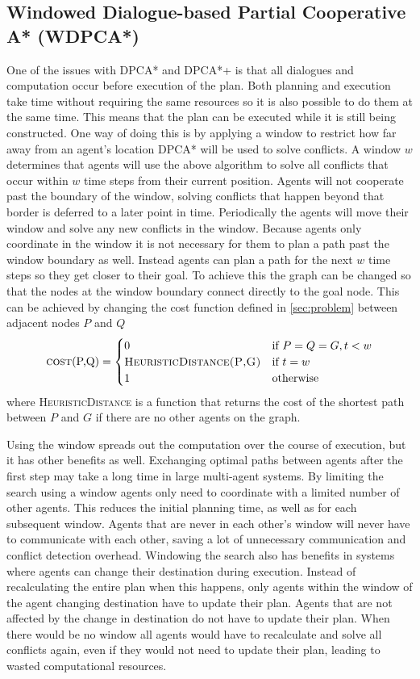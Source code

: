 \subsection{Windowed Dialogue-based Partial Cooperative A* (WDPCA*)}
One of the issues with DPCA* and DPCA*+ is that all dialogues and computation
occur before execution of the plan. Both planning and execution take time
without requiring the same resources so it is also possible to do them at the
same time. This means that the plan can be executed while it is still being
constructed. One way of doing this is by applying a window to restrict how far
away from an agent's location DPCA* will be used to solve conflicts. A
window $w$ determines that agents will use the above algorithm to solve all
conflicts that occur within $w$ time steps from their current position. Agents
will not cooperate past the boundary of the window, solving conflicts that
happen beyond that border is deferred to a later point in time. Periodically
the agents will move their window and solve any new conflicts in the window.
Because agents only coordinate in the window it is not necessary for them to
plan a path past the window boundary as well. Instead agents can plan a path
for the next $w$ time steps so they get closer to their goal. To achieve this
the graph can be changed so that the nodes at the window boundary connect
directly to the goal node. This can be achieved by changing the cost function
defined in \autoref{sec:problem} between adjacent nodes $P$ and $Q$
\citep{silver2005}
\[
\text{\textsc{cost}(P,Q)} =
\begin{cases}
    0 & \text{if } P = Q = G, t < w \\
    \textsc{HeuristicDistance(P,G)} & \text{if } t = w \\
    1 & \text{otherwise}
\end{cases}
\]
where \textsc{HeuristicDistance} is a function that returns the cost of the
shortest path between $P$ and $G$ if there are no other agents on the graph.

Using the window spreads out the computation over the course of execution, but
it has other benefits as well. Exchanging optimal paths between agents after
the first step may take a long time in large multi-agent systems.
By limiting the search using a window agents only need to coordinate with a
limited number of other agents. This reduces
the initial planning time, as well as for each subsequent window. Agents that
are never in each other's window will never have to communicate with each other,
saving a lot of unnecessary communication and conflict detection overhead.
Windowing the search also has benefits in systems where agents can change their
destination during execution. Instead of recalculating the entire plan when
this happens, only agents within the window of the agent changing destination
have to update their plan. Agents that are not affected by the change in
destination do not have to update their plan. When there would be no window all
agents would have to recalculate and solve all conflicts again, even if they
would not need to update their plan, leading to wasted computational resources.

